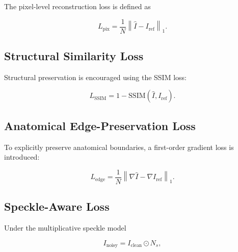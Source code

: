 \documentclass[conference]{IEEEtran}
\begin{document}
The pixel-level reconstruction loss is defined as

\begin{equation}
L_{\mathrm{pix}}
=
\frac{1}{N}
\left\|
\hat I-I_{\mathrm{ref}}
\right\|_1.
\label{eq:pixel_loss}
\end{equation}



\subsection{Structural Similarity Loss}

Structural preservation is encouraged using the SSIM loss:

\begin{equation}
L_{\mathrm{SSIM}}
=
1-
\mathrm{SSIM}
\left(
\hat I,I_{\mathrm{ref}}
\right).
\label{eq:ssim_loss}
\end{equation}



\subsection{Anatomical Edge-Preservation Loss}

To explicitly preserve anatomical boundaries, a first-order gradient
loss is introduced:

\begin{equation}
L_{\mathrm{edge}}
=
\frac{1}{N}
\left\|
\nabla\hat I
-
\nabla I_{\mathrm{ref}}
\right\|_1.
\label{eq:edge_loss}
\end{equation}



\subsection{Speckle-Aware Loss}

Under the multiplicative speckle model

\begin{equation}
I_{\mathrm{noisy}}
=
I_{\mathrm{clean}}
\odot N_s,
\end{equation}
\end{document}
